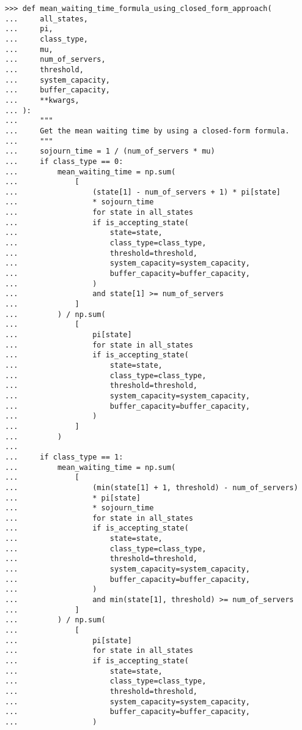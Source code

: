 \begin{lstlisting}[style=pystyle]
>>> def mean_waiting_time_formula_using_closed_form_approach(
...     all_states,
...     pi,
...     class_type,
...     mu,
...     num_of_servers,
...     threshold,
...     system_capacity,
...     buffer_capacity,
...     **kwargs,
... ):
...     """
...     Get the mean waiting time by using a closed-form formula.
...     """
...     sojourn_time = 1 / (num_of_servers * mu)
...     if class_type == 0:
...         mean_waiting_time = np.sum(
...             [
...                 (state[1] - num_of_servers + 1) * pi[state]
...                 * sojourn_time
...                 for state in all_states
...                 if is_accepting_state(
...                     state=state,
...                     class_type=class_type,
...                     threshold=threshold,
...                     system_capacity=system_capacity,
...                     buffer_capacity=buffer_capacity,
...                 )
...                 and state[1] >= num_of_servers
...             ]
...         ) / np.sum(
...             [
...                 pi[state]
...                 for state in all_states
...                 if is_accepting_state(
...                     state=state,
...                     class_type=class_type,
...                     threshold=threshold,
...                     system_capacity=system_capacity,
...                     buffer_capacity=buffer_capacity,
...                 )
...             ]
...         )
...
...     if class_type == 1:
...         mean_waiting_time = np.sum(
...             [
...                 (min(state[1] + 1, threshold) - num_of_servers)
...                 * pi[state]
...                 * sojourn_time
...                 for state in all_states
...                 if is_accepting_state(
...                     state=state,
...                     class_type=class_type,
...                     threshold=threshold,
...                     system_capacity=system_capacity,
...                     buffer_capacity=buffer_capacity,
...                 )
...                 and min(state[1], threshold) >= num_of_servers
...             ]
...         ) / np.sum(
...             [
...                 pi[state]
...                 for state in all_states
...                 if is_accepting_state(
...                     state=state,
...                     class_type=class_type,
...                     threshold=threshold,
...                     system_capacity=system_capacity,
...                     buffer_capacity=buffer_capacity,
...                 )

\end{lstlisting}
